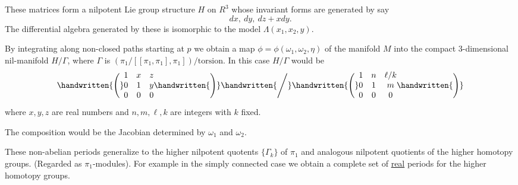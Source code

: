 These matrices form a nilpotent Lie group structure \(H\) on \(R^3\) whose invariant forms are generated by say
\[
 dx,\ dy,\ dz+xdy.
\]
The differential algebra generated by these is isomorphic to the model \(\Lambda(x_1,x_2,y)\).

By integrating along non-closed paths starting at \(p\) we obtain a map \(\phi=\phi(\omega_1,\omega_2,\eta)\) of the manifold \(M\) into the compact 3-dimensional nil-manifold \(H/\Gamma\),
where \(\Gamma\) is \((\pi_1/[[\pi_1,\pi_1],\pi_1])/\text{torsion}\). In this case \(H/\Gamma\) would be
\[
 \mathopen{\handwritten{\Bigg(}}\begin{matrix}1&x&z\\0&1&y\\0&0&0\end{matrix}\mathclose{\handwritten{\Bigg)}}
 \handwritten{\Bigg/}
 \mathopen{\handwritten{\Bigg(}}\begin{matrix}1&n&\ell/k\\0&1&m\\0&0&0\end{matrix}\mathclose{\handwritten{\Bigg)}}
\]
where \(x,y,z\) are real numbers and \(n,m,\ell,k\) are integers with \(k\) fixed.

The composition
would be the Jacobian determined by \(\omega_1\) and \(\omega_2\).

These non-abelian periods generalize to the higher nilpotent quotents \(\{\Gamma_k\}\) of \(\pi_1\) and analogous nilpotent quotients of the higher homotopy groups. (Regarded as \(\pi_1\)-modules). For example in the simply connected case we obtain a complete set of \uline{real} periods for the higher homotopy groups.
